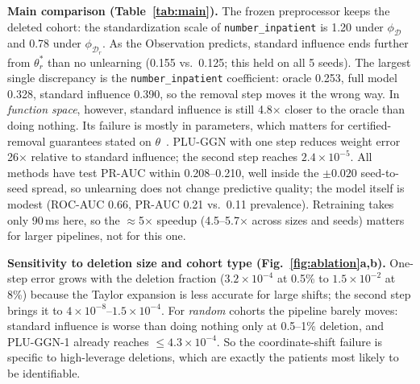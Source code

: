 \documentclass{article}
\newcommand{\Dr}{\mathcal{D}_r}
\newcommand{\D}{\mathcal{D}}
\begin{document}
\textbf{Main comparison (Table~\ref{tab:main}).} The frozen preprocessor keeps the deleted cohort:
the standardization scale of \texttt{number\_inpatient} is 1.20 under $\phi_\D$ and 0.78 under
$\phi_{\Dr}$. As the Observation predicts, standard influence ends further from $\theta_r^*$ than no
unlearning (0.155 vs.\ 0.125; this held on all 5 seeds). The largest single discrepancy is the
\texttt{number\_inpatient} coefficient: oracle 0.253, full model 0.328, standard influence 0.390,
so the removal step moves it the wrong way. In \emph{function space}, however, standard influence
is still 4.8$\times$ closer to the oracle than doing nothing. Its failure is mostly in parameters,
which matters for certified-removal guarantees stated on $\theta$~\cite{guo2020}. PLU-GGN with one
step reduces weight error 26$\times$ relative to standard influence; the second step reaches
$2.4\times10^{-5}$. All methods have test PR-AUC within 0.208--0.210, well inside the
$\pm0.020$ seed-to-seed spread, so unlearning does not change predictive quality; the model itself is
modest (ROC-AUC 0.66, PR-AUC 0.21 vs.\ 0.11 prevalence). Retraining takes only 90\,ms here, so the
$\approx$5$\times$ speedup (4.5--5.7$\times$ across sizes and seeds) matters for larger pipelines, not for this one.

\textbf{Sensitivity to deletion size and cohort type (Fig.~\ref{fig:ablation}a,b).} One-step error
grows with the deletion fraction ($3.2\times10^{-4}$ at 0.5\% to $1.5\times10^{-2}$ at 8\%) because
the Taylor expansion is less accurate for large shifts; the second step brings it to
$4\times10^{-8}$--$1.5\times10^{-4}$. For \emph{random} cohorts the pipeline barely moves: standard influence is
worse than doing nothing only at 0.5--1\% deletion, and PLU-GGN-1 already reaches $\le4.3\times10^{-4}$.
So the coordinate-shift failure is specific to high-leverage deletions, which are exactly the
patients most likely to be identifiable.
\end{document}
